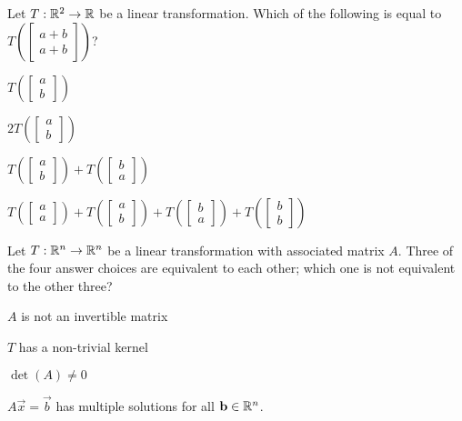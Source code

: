 \documentclass{article}
\begin{document}
\begin{readinessAssuranceTest}
\item Let $T: \mathbb{R}^2 \rightarrow \mathbb{R}$ be a linear transformation.  Which of the following is equal to $T\left(\begin{bmatrix} a+b \\ a+b \end{bmatrix}\right)$?
\begin{multicols}{2}
\begin{readinessAssuranceTestChoices}
\item $T\left(\begin{bmatrix}a \\ b \end{bmatrix} \right)$
\item $2T\left(\begin{bmatrix}a \\ b \end{bmatrix} \right)$
\item $T\left(\begin{bmatrix}a \\ b \end{bmatrix} \right)+T\left(\begin{bmatrix}b \\ a \end{bmatrix} \right)$
\item $T\left(\begin{bmatrix} a \\ a \end{bmatrix}\right)+T\left(\begin{bmatrix}a \\ b \end{bmatrix} \right)+T\left(\begin{bmatrix}b \\ a \end{bmatrix}\right)+T\left(\begin{bmatrix}b \\ b \end{bmatrix} \right)$
\end{readinessAssuranceTestChoices}
\end{multicols}

\item Let $T: \mathbb{R}^n \rightarrow \mathbb{R}^n$ be a linear transformation with associated matrix $A$.  Three of the four answer choices are equivalent to each other; which one is not equivalent to the other three?\begin{readinessAssuranceTestChoices}
\item $A$ is not an invertible matrix
\item $T$ has a non-trivial kernel
\item $\det(A)\neq 0$
\item $A\vec{x}=\vec{b}$ has multiple solutions for all $\mathbf{b} \in \mathbb{R}^n$.
\end{readinessAssuranceTestChoices}


\end{readinessAssuranceTest}
\end{document}
